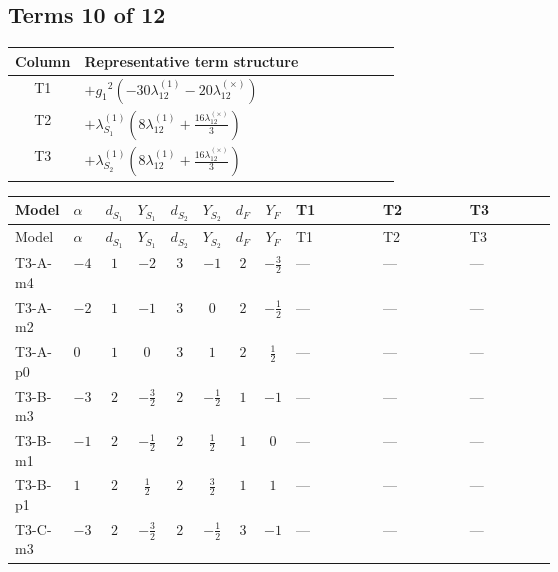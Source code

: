 \documentclass[8pt]{article}
\begin{document}
\begin{landscape}
\subsection*{Terms 10 of 12}
\begin{center}
\begin{tabular}{@{}c >{\raggedright\arraybackslash}p{0.82\linewidth}@{}}
\toprule
Column & Representative term structure \\
\midrule
T1 & \(\displaystyle +{g_1}^2 (-30 {\lambda_{12}^{(1)}}-20 {\lambda_{12}^{(\times)}})\) \\
\midrule
T2 & \(\displaystyle +{\lambda_{S_1}^{(1)}} \left(8 {\lambda_{12}^{(1)}}+\frac{16 {\lambda_{12}^{(\times)}}}{3}\right)\) \\
\midrule
T3 & \(\displaystyle +{\lambda_{S_2}^{(1)}} \left(8 {\lambda_{12}^{(1)}}+\frac{16 {\lambda_{12}^{(\times)}}}{3}\right)\) \\
\midrule
\bottomrule
\end{tabular}
\end{center}
\smallskip
\tiny
\begin{longtable}{@{}llcccccc >{\raggedright\arraybackslash}p{0.21\linewidth} >{\raggedright\arraybackslash}p{0.21\linewidth} >{\raggedright\arraybackslash}p{0.21\linewidth}@{}}
\toprule
Model & $\alpha$ & $d_{S_1}$ & $Y_{S_1}$ & $d_{S_2}$ & $Y_{S_2}$ & $d_F$ & $Y_F$ & T1 & T2 & T3 \\
\midrule
\endfirsthead
\toprule
Model & $\alpha$ & $d_{S_1}$ & $Y_{S_1}$ & $d_{S_2}$ & $Y_{S_2}$ & $d_F$ & $Y_F$ & T1 & T2 & T3 \\
\midrule
\endhead
T3-A-m4 & $-4$ & $1$ & $-2$ & $3$ & $-1$ & $2$ & $-\frac{3}{2}$ & --- & --- & --- \\
\midrule
T3-A-m2 & $-2$ & $1$ & $-1$ & $3$ & $0$ & $2$ & $-\frac{1}{2}$ & --- & --- & --- \\
\midrule
T3-A-p0 & $0$ & $1$ & $0$ & $3$ & $1$ & $2$ & $\frac{1}{2}$ & --- & --- & --- \\
\midrule
T3-B-m3 & $-3$ & $2$ & $-\frac{3}{2}$ & $2$ & $-\frac{1}{2}$ & $1$ & $-1$ & --- & --- & --- \\
\midrule
T3-B-m1 & $-1$ & $2$ & $-\frac{1}{2}$ & $2$ & $\frac{1}{2}$ & $1$ & $0$ & --- & --- & --- \\
\midrule
T3-B-p1 & $1$ & $2$ & $\frac{1}{2}$ & $2$ & $\frac{3}{2}$ & $1$ & $1$ & --- & --- & --- \\
\midrule
T3-C-m3 & $-3$ & $2$ & $-\frac{3}{2}$ & $2$ & $-\frac{1}{2}$ & $3$ & $-1$ & --- & --- & --- \\
\midrule

\end{longtable}
\end{landscape}
\end{document}
